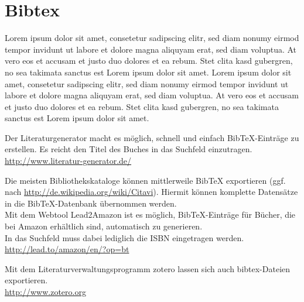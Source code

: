 
\chapter{Bibtex}

Lorem ipsum dolor sit amet, consetetur sadipscing elitr, sed diam nonumy eirmod tempor invidunt ut labore et dolore magna aliquyam erat, sed diam voluptua. At vero eos et accusam et justo duo dolores et ea rebum. Stet clita kasd gubergren, no sea takimata sanctus est Lorem ipsum dolor sit amet. Lorem ipsum dolor sit amet, consetetur sadipscing elitr, sed diam nonumy eirmod tempor invidunt ut labore et dolore magna aliquyam erat, sed diam voluptua. At vero eos et accusam et justo duo dolores et ea rebum. Stet clita kasd gubergren, no sea takimata sanctus est Lorem ipsum dolor sit amet. \cite{bibtex.a}

Der Literaturgenerator macht es möglich, schnell und einfach BibTeX-Einträge zu erstellen.
Es reicht den Titel des Buches in das Suchfeld einzutragen.\\
\url{http://www.literatur-generator.de/}

Die meisten Bibliothekskataloge können mittlerweile BibTeX exportieren (ggf. nach \url{http://de.wikipedia.org/wiki/Citavi}). Hiermit können komplette Datensätze in die BibTeX-Datenbank übernommen werden.\\
Mit dem Webtool Lead2Amazon ist es möglich, BibTeX-Einträge für Bücher, die bei Amazon erhältlich sind, automatisch zu generieren.\\
In das Suchfeld muss dabei lediglich die ISBN eingetragen werden.\\
\url{http://lead.to/amazon/en/?op=bt}

Mit dem Literaturverwaltungsprogramm zotero lassen sich auch bibtex-Dateien exportieren.\\
\url{http://www.zotero.org}

\Blinddocument

\Blinddocument
